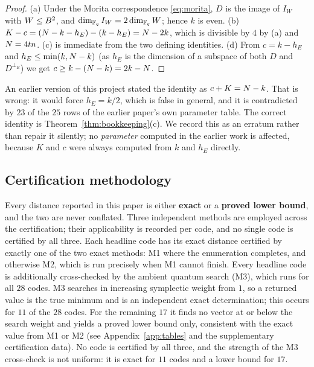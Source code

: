 \begin{proof}
(a) Under the Morita correspondence \eqref{eq:morita}, $D$ is the image of
$I_W$ with $W\le B^2$, and $\dim_{\mathbb F_q}I_W=2\dim_{\mathbb F_q}W$; hence $k$ is even.
(b) $K-c=(N-k-h_E)-(k-h_E)=N-2k$, which is divisible by $4$ by (a)
and $N=4tn$. (c) is immediate from the two defining identities. (d) From
$c=k-h_E$ and $h_E\le\min(k,N-k)$ (as $h_E$ is the dimension of a subspace
of both $D$ and $D^{\perp_E}$) we get $c\ge k-(N-k)=2k-N$.
\end{proof}

\begin{remark}[erratum]
An earlier version of this project stated the identity as $c+K=N-k$. That
is wrong: it would force $h_E=k/2$, which is false in general, and it is
contradicted by $23$ of the $25$ rows of the earlier paper's own parameter
table. The correct identity is Theorem~\ref{thm:bookkeeping}(c). We record this
as an erratum rather than repair it silently; no \emph{parameter} computed in
the earlier work is affected, because $K$ and $c$ were always computed from
$k$ and $h_E$ directly.
\end{remark}

\subsection{Certification methodology}

Every distance reported in this paper is either \textbf{exact} or a
\textbf{proved lower bound}, and the two are never conflated. Three
independent methods are employed across the certification; their applicability
is recorded per code, and no single code is certified by all three. Each
headline code has its exact distance certified by exactly one of the two exact
methods: M1 where the enumeration completes, and otherwise M2, which is run
precisely when M1 cannot finish. Every headline code is additionally
cross-checked by the ambient quantum search (M3), which runs for all $28$ codes.
M3 searches in increasing symplectic weight from $1$, so a returned value is the
true minimum and is an independent exact determination; this occurs for $11$ of
the $28$ codes. For the remaining $17$ it finds no vector at or below the
search weight and yields a proved lower bound only, consistent with the exact
value from M1 or M2 (see Appendix~\ref{app:tables} and the supplementary
certification data). No code is certified by all three, and the strength of the
M3 cross-check is not uniform: it is exact for $11$ codes and a lower bound for
$17$.

